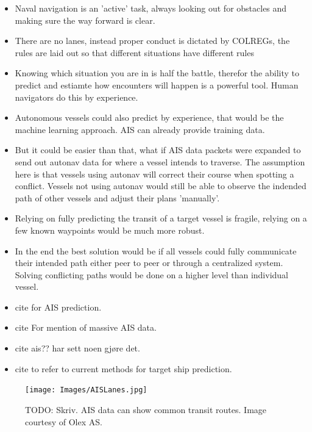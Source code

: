 \begin{itemize}
    \item Naval navigation is an 'active' task, always looking out for obstacles and making sure the way forward is clear.
    \item There are no lanes, instead proper conduct is dictated by \gls{COLREGs}, the rules are laid out so that different situations
    have different rules
    \item Knowing which situation you are in is half the battle, therefor the ability to predict and estiamte how encounters will happen
    is a powerful tool. Human navigators do this by experience.
    \item Autonomous vessels could also predict by experience, that would be the machine learning approach. \gls{AIS} can already provide training data.
    \item But it could be easier than that, what if \gls{AIS} data packets were expanded to send out autonav data for where a vessel intends to traverse.
    The assumption here is that vessels using autonav will correct their course when spotting a conflict. Vessels not using autonav would still be able to observe
    the indended path of other vessels and adjust their plans 'manually'.
    \item Relying on fully predicting the transit of a target vessel is fragile, relying on a few known waypoints would be much more robust.
    \item In the end the best solution would be if all vessels could fully communicate their intended path either peer to peer or through
    a centralized system. Solving conflicting paths would be done on a higher level than individual vessel.
    \item cite \cite{scholler2021trajectory} for AIS prediction.
    \item cite \cite{zhang2021collision} For mention of massive AIS data.
    \item cite ais?? har sett noen gjøre det.
    \item cite \cite{huang2020ship} to refer to current methods for target ship prediction.
\end{itemize}

\begin{figure}
    \centering
    \label{FIG: AIS lanes}
    \texttt{[image: Images/AISLanes.jpg]}
    \caption{TODO: Skriv. AIS data can show common transit routes. Image courtesy of Olex AS.}
\end{figure}



\newpage